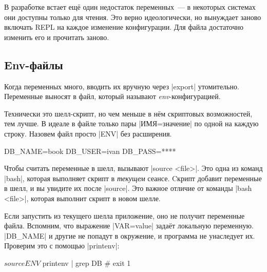 В разработке встает ещ\"{е} один недостаток переменных~--- в некоторых системах
они доступны только для чтения. Это верно идеологически, но вынуждает заново
включать REPL на каждое изменение конфигурации. Для файла достаточно изменить
его и прочитать заново.

\subsection{Env-файлы}


Когда переменных много, вводить их вручную через \spverb|export|
утомительно. Переменные выносят в файл, который называют
\emph{env}-конфигурацией.

Технически это шелл-скрипт, но чем меньше в н\"{е}м скриптовых возможностей, тем
лучше. В идеале в файле только пары \spverb|ИМЯ=значение| по одной на каждую
строку. Назовем файл просто \spverb|ENV| без расширения.

\begin{english}
  \begin{bash}
DB_NAME=book
DB_USER=ivan
DB_PASS=****
  \end{bash}
\end{english}

Чтобы считать переменные в шелл, вызывают \spverb|source <file>|. Это одна из
команд \spverb|bash|, которая выполняет скрипт в \emph{текущем} сеансе. Cкрипт
добавит переменные в шелл, и вы увидите их после \spverb|source|. Это
важное отличие от команды \spverb|bash <file>|, которая выполнит скрипт в новом
шелле.

\begin{english}
\end{english}

Если запустить из текущего шелла приложение, оно не получит переменные
файла. Вспомним, что выражение \spverb|VAR=value| зада\"{е}т локальную
переменную. \spverb|DB_NAME| и другие не попадут в окружение, и программа не
унаследует их. Проверим это с помощью \spverb|printenv|:


\begin{english}
  \begin{bash}
$ source ENV
$ printenv | grep DB
# exit 1
  \end{bash}
\end{english}

